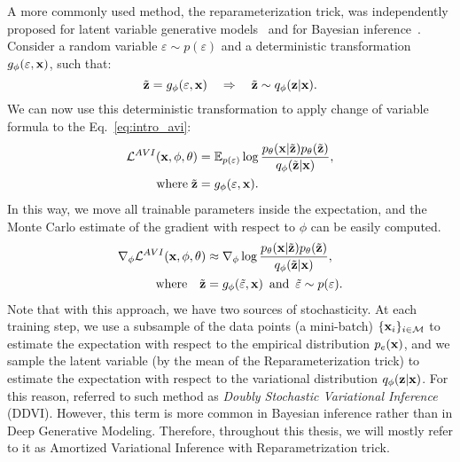 A more commonly used method, the reparameterization trick, was independently proposed for latent variable generative models~\cite{kingma2014autoencoding, rezende2014stochastic} and for Bayesian inference~\citep{titsias2014doubly}. 
Consider a random variable $\varepsilon \sim p(\varepsilon)$ and a deterministic transformation $g_{\phi}(\varepsilon, {\mathbf{x}})$, such that:
\begin{equation}
    \tilde{{\mathbf{z}}} = g_{\phi}(\varepsilon, {\mathbf{x}})\quad \Rightarrow \quad  \tilde{{\mathbf{z}}} \sim q_{\phi}({\mathbf{z}}|{\mathbf{x}}).
\end{equation}
We can now use this deterministic transformation to apply change of variable formula to the Eq.~\ref{eq:intro_avi}:
\begin{equation}
\begin{aligned}
     \mathcal{L}^{AVI}({\mathbf{x}}, \phi, \theta) &=  \mathbb{E}_{p(\varepsilon)}\log  \frac{p_{\theta}({\mathbf{x}}|\tilde{{\mathbf{z}}})p_{\theta}(\tilde{{\mathbf{z}}})}{q_{\phi}(\tilde{{\mathbf{z}}}|{\mathbf{x}})},\\
     \text{where}\; \tilde{{\mathbf{z}}} &= g_{\phi}(\varepsilon, {\mathbf{x}}).
\end{aligned}
\end{equation}
In this way, we move all trainable parameters inside the expectation, and the Monte Carlo estimate of the gradient with respect to $\phi$ can be easily computed. 
\begin{equation}
\begin{aligned}
    \nabla_{\phi}\mathcal{L}^{AVI}({\mathbf{x}}, \phi, \theta) &\approx  \nabla_{\phi}\log  \frac{p_{\theta}({\mathbf{x}}|\tilde{{\mathbf{z}}})p_{\theta}(\tilde{{\mathbf{z}}})}{q_{\phi}(\tilde{{\mathbf{z}}}|{\mathbf{x}})}, \\
    \text{where}\quad \tilde{{\mathbf{z}}} &= g_{\phi}(\tilde{\varepsilon}, {\mathbf{x}})\,\text{ and }\, \tilde{\varepsilon} \sim p(\varepsilon).
\end{aligned}
\end{equation}
Note that with this approach, we have two sources of stochasticity. 
At each training step, we use a subsample of the data points (a mini-batch) $\{{\mathbf{x}}_i\}_{i \in \mathcal{M}}$ to estimate the expectation with respect to the empirical distribution $p_{e}({\mathbf{x}})$, and we sample the latent variable (by the mean of the Reparameterization trick) to estimate the expectation with respect to the variational distribution $q_{\phi}({\mathbf{z}}|{\mathbf{x}})$. 
For this reason, \citet{titsias2014doubly} referred to such method as \textit{Doubly Stochastic Variational Inference} (DDVI). 
However, this term is more common in Bayesian inference rather than in Deep Generative Modeling. 
Therefore, throughout this thesis, we will mostly refer to it as Amortized Variational Inference with Reparametrization trick.



